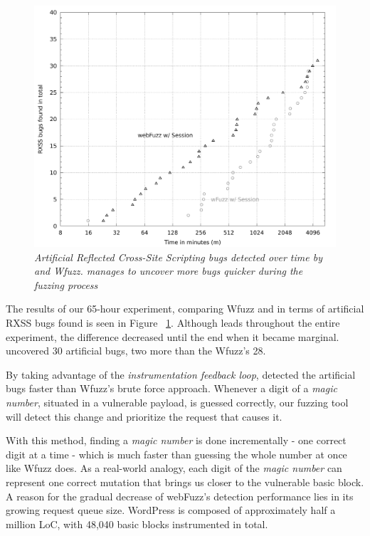 \begin{figure}[!htb]
  \centering \includegraphics[width=\linewidth]{figures/plot_bugs.pdf}
  \captionsetup{justification=centering}
  \caption[Number of artificial XSS bugs uncovered by \pname{} and Wfuzz]{\textit{Artificial Reflected Cross-Site Scripting bugs detected over time by \pname{} and Wfuzz. \pname{} manages to uncover more bugs quicker during the fuzzing process}} 
  \label{fig:plot_rxss}
\end{figure}

The results of our 65-hour experiment, comparing Wfuzz and \pname{} in terms of artificial RXSS bugs found is seen in Figure ~\ref{fig:plot_rxss}. Although \pname{} leads throughout the entire experiment, the difference decreased until the end when it became marginal. \pname{} uncovered 30 artificial bugs, two more than the Wfuzz's 28.

By taking advantage of the \emph{instrumentation feedback loop}, \pname{} detected the artificial bugs faster than Wfuzz's brute force approach. Whenever a digit of a \emph{magic number}, situated in a vulnerable payload, is guessed correctly, our fuzzing tool will detect this change and prioritize the request that causes it. 

With this method, finding a \emph{magic number} is done incrementally - one correct digit at a time - which is much faster than guessing the whole number at once like Wfuzz does. As a real-world analogy, each digit of the \emph{magic number} can represent one correct mutation that brings us closer to the vulnerable basic block. A reason for the gradual decrease of webFuzz's detection performance lies in its growing request queue size. WordPress is composed of approximately half a million LoC, with 48,040 basic blocks instrumented in total.

